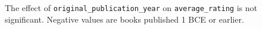 \documentclass[11pt]{article}
\begin{document}
\begin{figure}
    \begin{center}
    \end{center}
    \caption[Average Rating by Publication Year]{The effect of \texttt{original\_publication\_year} on
\texttt{average\_rating} is not significant. Negative values are
books published 1 BCE or earlier.}
     \label{fig:average-rating-reviews-count}
\end{figure}
    
%    




\end{document}
